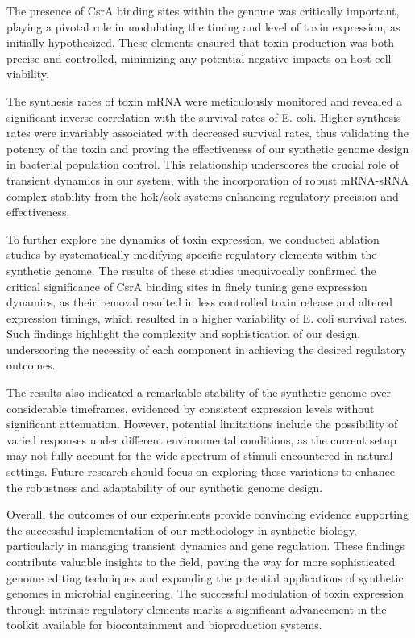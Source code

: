 \documentclass{article}
\begin{document}
The presence of CsrA binding sites within the genome was critically important, playing a pivotal role in modulating the timing and level of toxin expression, as initially hypothesized. These elements ensured that toxin production was both precise and controlled, minimizing any potential negative impacts on host cell viability.

The synthesis rates of toxin mRNA were meticulously monitored and revealed a significant inverse correlation with the survival rates of E. coli. Higher synthesis rates were invariably associated with decreased survival rates, thus validating the potency of the toxin and proving the effectiveness of our synthetic genome design in bacterial population control. This relationship underscores the crucial role of transient dynamics in our system, with the incorporation of robust mRNA-sRNA complex stability from the hok/sok systems enhancing regulatory precision and effectiveness.

To further explore the dynamics of toxin expression, we conducted ablation studies by systematically modifying specific regulatory elements within the synthetic genome. The results of these studies unequivocally confirmed the critical significance of CsrA binding sites in finely tuning gene expression dynamics, as their removal resulted in less controlled toxin release and altered expression timings, which resulted in a higher variability of E. coli survival rates. Such findings highlight the complexity and sophistication of our design, underscoring the necessity of each component in achieving the desired regulatory outcomes.

The results also indicated a remarkable stability of the synthetic genome over considerable timeframes, evidenced by consistent expression levels without significant attenuation. However, potential limitations include the possibility of varied responses under different environmental conditions, as the current setup may not fully account for the wide spectrum of stimuli encountered in natural settings. Future research should focus on exploring these variations to enhance the robustness and adaptability of our synthetic genome design. 

Overall, the outcomes of our experiments provide convincing evidence supporting the successful implementation of our methodology in synthetic biology, particularly in managing transient dynamics and gene regulation. These findings contribute valuable insights to the field, paving the way for more sophisticated genome editing techniques and expanding the potential applications of synthetic genomes in microbial engineering. The successful modulation of toxin expression through intrinsic regulatory elements marks a significant advancement in the toolkit available for biocontainment and bioproduction systems.
\end{document}
